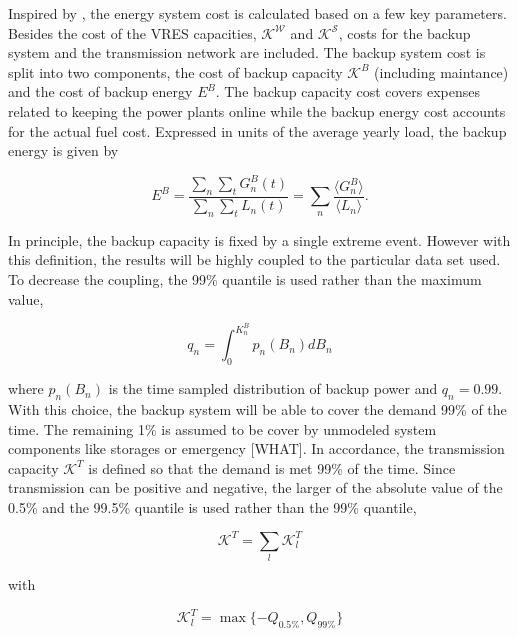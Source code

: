 \documentclass[a4paper, 12pt, sort&compress]{elsarticle}%
\begin{document}
Inspired by \cite{Sensitivity}, the energy system cost is calculated
based on a few key parameters. Besides the cost of the VRES
capacities, $\mathcal{K^{W}}$ and $\mathcal{K^S}$, costs for the
backup system and the transmission network are included. The backup
system cost is split into two components, the cost of backup capacity
$\mathcal{K}^{B}$ (including maintance) and the cost of backup energy
$E^{B}$. The backup capacity cost covers expenses related to keeping
the power plants online while the backup energy cost accounts for the
actual fuel cost. Expressed in units of the average yearly load, the
backup energy is given by

\begin{equation}
  \label{eq:backup-energy}
  E^{B} =\frac{\sum_{n} \sum_{t} G^{B}_{n}(t)}{\sum_{n} \sum_{t}
    L_{n}(t)} = \sum_{n} \frac{\langle G^{B}_{n} \rangle}{\langle L_{n}
    \rangle} .
\end{equation}

In principle, the backup capacity is fixed by a single extreme
event. However with this definition, the results will be highly
coupled to the particular data set used. To decrease the coupling, the
99\% quantile is used rather than the maximum value,

\begin{equation}
  \label{eq:2}
  q_{n} = \int _{0} ^{K_{n}^{B}} p_{n}(B_{n})dB_{n}
\end{equation}

where $p_{n}(B_{n})$ is the time sampled distribution of backup power
and $q_{n} = 0.99$. With this choice, the backup system will be able
to cover the demand 99\% of the time. The remaining 1\% is assumed to
be cover by unmodeled system components like storages or emergency
[WHAT]. In accordance, the transmission capacity $\mathcal{K}^{T}$ is
defined so that the demand is met 99\% of the time. Since transmission
can be positive and negative, the larger of the absolute value of the
0.5\% and the 99.5\% quantile is used rather than the 99\% quantile,

\begin{equation}
  \label{eq:4}
  \mathcal{K}^{T} = \sum_{l} \mathcal{K}^{T}_{l} 
\end{equation}

with

\begin{equation}
  \label{eq:4}
  \mathcal{K}_{l}^{T} = \max \{-Q_{0.5\%} , Q_{99\%} \}
\end{equation}
\end{document}
